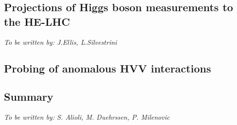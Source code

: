 \documentclass[../report.tex]{subfiles}
\providecommand{\main}{..}
\begin{document}
\subsection{Projections of Higgs boson measurements to the HE-LHC}
{\it To be written by: J.Ellis, L.Silvestrini}


\subsection{Probing of anomalous HVV interactions}


\subsection{Summary}
\begin{center}{\it To be written by: S. Alioli, M. Duehrssen, P. Milenovic} \end{center}
\end{document}
